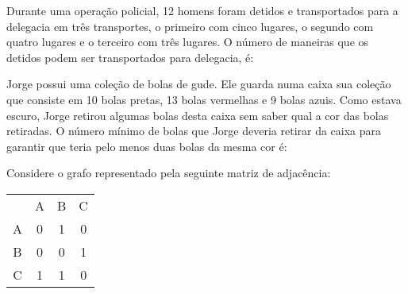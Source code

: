 \documentclass[16pt]{examdesign}
\begin{document}
\begin{multiplechoice}[title={Questões de múltipla escolha (3 pontos cada) },rearrange=yes, resetcounter=no,suppressprefix,examcolumns=2,keycolumns=2]
    \begin{question}
    [FUNCAB, PC-PA, 2016] Durante uma operação policial, 12 homens foram detidos e 
    transportados para a delegacia em três transportes, o primeiro com cinco lugares, o segundo com quatro 
    lugares e o terceiro com três lugares. O número de maneiras que os detidos podem ser transportados para delegacia, é:
 
 		  
 
   \end{question}
  \begin{question}
	 Jorge possui uma coleção de bolas de gude. Ele guarda numa caixa sua coleção que consiste em 10 bolas pretas, 
	13 bolas vermelhas e 9 bolas azuis. Como estava escuro, Jorge retirou algumas bolas desta caixa sem saber qual a cor das bolas retiradas. 
	O número mínimo de bolas que Jorge deveria retirar da caixa para garantir que teria pelo menos duas bolas da mesma cor é:
  \end{question}
  
   \begin{question}
      Considere o grafo representado pela seguinte matriz de adjacência: 

      \begin{center}
 


      \begin{tabular}{cccc}
                       & A                      & B                      & C                      \\ \cline{2-4} 
\multicolumn{1}{c|}{A} & \multicolumn{1}{c|}{0} & \multicolumn{1}{c|}{1} & \multicolumn{1}{c|}{0} \\ \cline{2-4} 
\multicolumn{1}{c|}{B} & \multicolumn{1}{c|}{0} & \multicolumn{1}{c|}{0} & \multicolumn{1}{c|}{1} \\ \cline{2-4} 
\multicolumn{1}{c|}{C} & \multicolumn{1}{c|}{1} & \multicolumn{1}{c|}{1} & \multicolumn{1}{c|}{0} \\ \cline{2-4} 
\end{tabular}
\end{center}


\end{question}
\end{multiplechoice}
\end{document}
